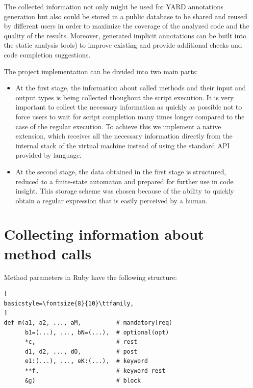\documentclass[conference]{IEEEtran}
\begin{document}
The collected information not only might be used for YARD annotations generation but also could be stored in a public
database to be shared and reused by different users in order to maximize the coverage of the analyzed code and the
quality of the results. Moreover, generated implicit annotations can be built into the static analysis
tools\cite{Control_flow_analysis_in_scheme}) to improve existing and provide additional checks and code completion
suggestions.

The project implementation can be divided into two main parts:
\begin{itemize}  
  \item At the first stage, the information about called methods and their input and output types is being collected
    thoughout the script execution. It is very important to collect the necessary information as quickly as possible not
    to force users to wait for script completion many times longer compared to the case of the regular execution. To
    achieve this we implement a native extension, which receives all the necessary information directly from the
    internal stack of the virtual machine instead of using the standard API provided by language.

  \item At the second stage, the data obtained in the first stage is structured, reduced to a finite-state automaton and
    prepared for further use in code insight. This storage scheme was chosen because of the ability to quickly obtain a
    regular expression that is easily perceived by a human.
\end{itemize}

\section{Collecting information about method calls}
Method parameters in Ruby have the following structure:
\begin{lstlisting}[
basicstyle=\fontsize{8}{10}\ttfamily,
]
def m(a1, a2, ..., aM,          # mandatory(req)
      b1=(...), ..., bN=(...),  # optional(opt)
      *c,                       # rest
      d1, d2, ..., dO,          # post
      e1:(...), ..., eK:(...),  # keyword
      **f,                      # keyword_rest
      &g)                       # block
\end{lstlisting}
\end{document}
